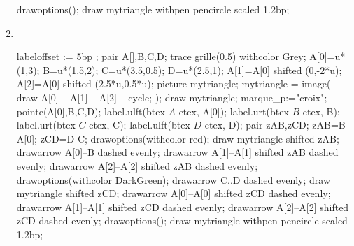 \begin{corrige}
\begin{changemargin}{-15mm}{0mm}
\begin{multicols}{2}
\begin{enumerate}
\begin{Geometrie}[CoinHD={(4u,4u)}]
                    drawoptions();
                    draw mytriangle withpen pencircle scaled 1.2bp;
                \end{Geometrie}
                \columnbreak
                \item \phantom{rrr}\\
                \begin{Geometrie}[CoinHD={(4u,4u)}]
                    labeloffset := 5bp ;
                    pair A[],B,C,D;
                    trace grille(0.5) withcolor Grey;
                    A[0]=u*(1,3);
                    B=u*(1.5,2);
                    C=u*(3.5,0.5);
                    D=u*(2.5,1);
                    A[1]=A[0] shifted (0,-2*u);
                    A[2]=A[0] shifted (2.5*u,0.5*u);
                    picture mytriangle;
                    mytriangle = image( 
                        draw A[0] -- A[1] -- A[2] -- cycle;
                    );
                    draw mytriangle;
                    marque_p:="croix";
                    pointe(A[0],B,C,D);
                    label.ulft(btex $A$ etex, A[0]);
                    label.urt(btex $B$ etex, B);
                    label.urt(btex $C$ etex, C);
                    label.ulft(btex $D$ etex, D);
                    pair zAB,zCD;
                    zAB=B-A[0];
                    zCD=D-C;
                    drawoptions(withcolor red);
                    draw mytriangle shifted zAB;
                    drawarrow A[0]--B dashed evenly;
                    drawarrow A[1]--A[1] shifted zAB dashed evenly;
                    drawarrow A[2]--A[2] shifted zAB dashed evenly;
                    drawoptions(withcolor DarkGreen);
                    drawarrow C..D dashed evenly;
                    draw mytriangle shifted zCD;
                    drawarrow A[0]--A[0] shifted zCD dashed evenly;
                    drawarrow A[1]--A[1] shifted zCD dashed evenly;
                    drawarrow A[2]--A[2] shifted zCD dashed evenly;
                    drawoptions();
                    draw mytriangle withpen pencircle scaled 1.2bp;                                        
                \end{Geometrie}
            \end{enumerate}
        \end{multicols}    
    \end{changemargin}
\end{corrige}

